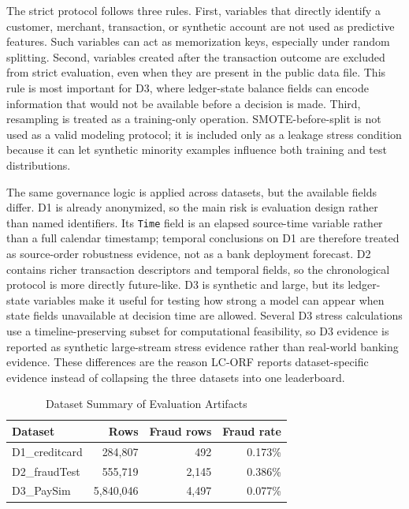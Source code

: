 \documentclass{ieeeaccess}
\begin{document}
The strict protocol follows three rules. First, variables that directly identify a customer, merchant, transaction, or synthetic account are not used as predictive features. Such variables can act as memorization keys, especially under random splitting. Second, variables created after the transaction outcome are excluded from strict evaluation, even when they are present in the public data file. This rule is most important for D3, where ledger-state balance fields can encode information that would not be available before a decision is made. Third, resampling is treated as a training-only operation. SMOTE-before-split is not used as a valid modeling protocol; it is included only as a leakage stress condition because it can let synthetic minority examples influence both training and test distributions.

The same governance logic is applied across datasets, but the available fields differ. D1 is already anonymized, so the main risk is evaluation design rather than named identifiers. Its \texttt{Time} field is an elapsed source-time variable rather than a full calendar timestamp; temporal conclusions on D1 are therefore treated as source-order robustness evidence, not as a bank deployment forecast. D2 contains richer transaction descriptors and temporal fields, so the chronological protocol is more directly future-like. D3 is synthetic and large, but its ledger-state variables make it useful for testing how strong a model can appear when state fields unavailable at decision time are allowed. Several D3 stress calculations use a timeline-preserving subset for computational feasibility, so D3 evidence is reported as synthetic large-stream stress evidence rather than real-world banking evidence. These differences are the reason LC-ORF reports dataset-specific evidence instead of collapsing the three datasets into one leaderboard.

\begin{table}[!t]
\caption{Dataset Summary of Evaluation Artifacts}
\label{tab:datasets}
\centering
\small
\renewcommand{\arraystretch}{1.10}
\begin{tabular}{|l|r|r|r|}
\hline
\textbf{Dataset} & \textbf{Rows} & \textbf{Fraud rows} & \textbf{Fraud rate}\\
\hline
D1\_creditcard & 284,807 & 492 & 0.173\%\\
\hline
D2\_fraudTest & 555,719 & 2,145 & 0.386\%\\
\hline
D3\_PaySim & 5,840,046 & 4,497 & 0.077\%\\
\hline
\end{tabular}
\end{table}
\end{document}
